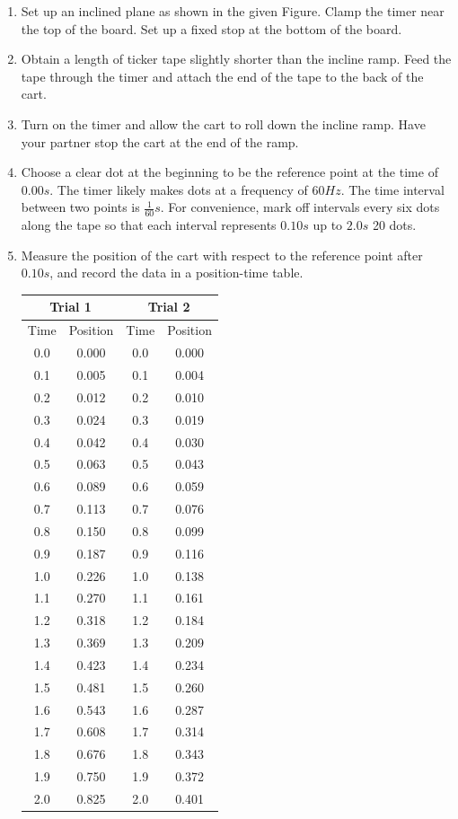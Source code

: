 \documentclass[12pt]{article}
\begin{document}
\begin{enumerate}
    \item Set up an inclined plane as shown in the given Figure. Clamp the timer near the top of the board. Set up a fixed stop at the bottom of the board.
    \item Obtain a length of ticker tape slightly shorter than the incline ramp. Feed the tape through the timer and attach the end of the tape to the back of the cart.
    \item Turn on the timer and allow the cart to roll down the incline ramp. Have your partner stop the cart at the end of the ramp.
    \item Choose a clear dot at the beginning to be the reference point at the time of $0.00 s$. The timer likely makes dots at a frequency of $60 Hz$. The time interval between two points is $\frac{1}{60} s$. For convenience, mark off intervals every six dots along the tape so that each interval represents $0.10 s$ up to $2.0 s$ 20 dots.
    \item Measure the position of the cart with respect to the reference point after $0.10 s$, and record the data in a position-time table.
    \begin{center}
        \begin{tabular}{c|c @{\hspace{5em}} c|c}
            \multicolumn{2}{c}{Trial 1}&\multicolumn{2}{c}{Trial 2}\\
            \hline
            Time&Position&Time&Position\\
            0.0 & 0.000 & 0.0 & 0.000\\
            0.1 & 0.005 & 0.1 & 0.004\\
            0.2 & 0.012 & 0.2 & 0.010\\
            0.3 & 0.024 & 0.3 & 0.019\\
            0.4 & 0.042 & 0.4 & 0.030\\
            0.5 & 0.063 & 0.5 & 0.043\\
            0.6 & 0.089 & 0.6 & 0.059\\
            0.7 & 0.113 & 0.7 & 0.076\\
            0.8 & 0.150 & 0.8 & 0.099\\
            0.9 & 0.187 & 0.9 & 0.116\\
            1.0 & 0.226 & 1.0 & 0.138\\
            1.1 & 0.270 & 1.1 & 0.161\\
            1.2 & 0.318 & 1.2 & 0.184\\
            1.3 & 0.369 & 1.3 & 0.209\\
            1.4 & 0.423 & 1.4 & 0.234\\
            1.5 & 0.481 & 1.5 & 0.260\\
            1.6 & 0.543 & 1.6 & 0.287\\
            1.7 & 0.608 & 1.7 & 0.314\\
            1.8 & 0.676 & 1.8 & 0.343\\
            1.9 & 0.750 & 1.9 & 0.372\\
            2.0 & 0.825 & 2.0 & 0.401\\


\end{tabular}
\end{center}
\end{enumerate}
\end{document}
